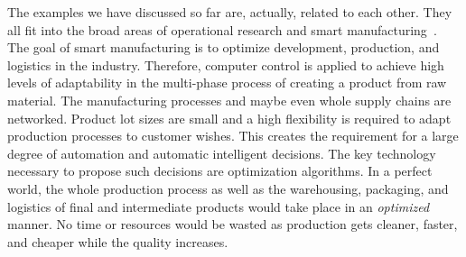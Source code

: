 %
%
The examples we have discussed so far are, actually, related to each other.
They all fit into the broad areas of operational research and smart manufacturing~\cite{DEPBS2012SMMIADDP,HPO2016DPFI4S}.
The goal of smart manufacturing is to optimize development, production, and logistics in the industry.
Therefore, computer control is applied to achieve high levels of adaptability in the multi-phase process of creating a product from raw material.
The manufacturing processes and maybe even whole supply chains are networked.
Product lot sizes are small and a high flexibility is required to adapt production processes to customer wishes.
This creates the requirement for a large degree of automation and automatic intelligent decisions.
The key technology necessary to propose such decisions are optimization algorithms.
In a perfect world, the whole production process as well as the warehousing, packaging, and logistics of final and intermediate products would take place in an \emph{optimized} manner.
No time or resources would be wasted as production gets cleaner, faster, and cheaper while the quality increases.%
%
\endhsection%
%
